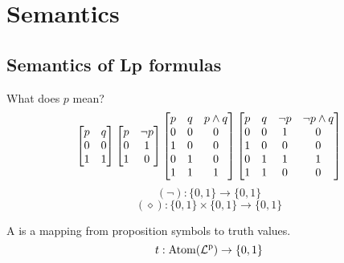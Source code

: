 \documentclass[12pt]{article}
\begin{document}
\section{Semantics}
\subsection{Semantics of Lp formulas}

What does \(p\) mean?
\[\begin{bmatrix} 
    p & q\\
    0 & 0\\
    1 & 1
 \end{bmatrix}
\begin{bmatrix} 
  p & \neg p\\
  0 & 1\\
  1 & 0
 \end{bmatrix}
\begin{bmatrix} 
  p & q & p\wedge q\\
  0 & 0 & 0\\
  1 & 0 & 0\\
  0 & 1 & 0\\
  1 & 1 & 1
 \end{bmatrix}
\begin{bmatrix} 
  p & q &\neg p& \neg p\wedge q\\
  0 & 0 & 1 & 0\\
  1 & 0 & 0 & 0\\
  0 & 1 & 1 & 1\\
  1 & 1 & 0 & 0
 \end{bmatrix}
\]
\[(\neg):\{0,1\}\to\{0,1\}\]
\[(\diamond):\{0,1\}\times\{0,1\}\to\{0,1\}\]

\bbox
\begin{defn}\label{defn:truth_evaluation}
  A  is a mapping from proposition symbols to
  truth values.
  \[t:\mathrm{Atom}(\mathrm{\mathcal{L}^p_{}})\to\{0,1\}\]
\end{defn}
\ebox
\end{document}
